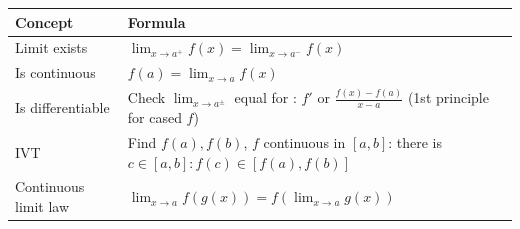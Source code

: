 \thispagestyle{empty}
\begin{landscape}
    \scriptsize

    \begin{multicols*}{2}
        \begin{tabularx}{\columnwidth}{@{}lX@{}}
            \textbf{Concept}                    & \textbf{Formula}                                                                                                                                                                                                                                                                                                       \\\hline
            Limit exists                        & $\lim_{x\to a^+}f(x)=\lim_{x\to a^-}f(x)$                                                                                                                                                                                                                                                                              \\
            Is continuous                       & $f(a)=\lim_{x\to a}f(x)$                                                                                                                                                                                                                                                                                               \\
            Is differentiable                   & Check $\lim_{x\to a^\pm}$ equal for : $f'$ or $\frac{f(x)-f(a)}{x-a}$ (1st principle for cased $f$)                                                                                                                                                                                                                                               \\
            IVT                                 & Find $f(a),f(b)$, $f$ continuous in $[a,b]$: there is $c\in[a,b]:f(c)\in[f(a),f(b)]$                                                                                                                                                                                                                                   \\
            Continuous limit law                & $\lim_{x\to a}f(g(x)) = f(\lim_{x\to a}g(x))$                                                                                                                                                                                                                                                                          \\

\end{tabularx}
\end{multicols*}
\end{landscape}
